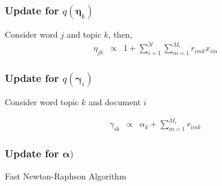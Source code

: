 \documentclass{beamer}
\numberwithin{equation}{section}
\begin{document}
\begin{frame}
\frametitle{Update for $q(\boldsymbol{\eta}_{k})$}

Consider word $j$ and topic $k$, then, 
\begin{eqnarray}
\eta_{jk} & \propto & 1 + \sum_{i=1}^{N} \sum_{m=1}^{M_{i}} r_{imk} x_{im} \nonumber 
\end{eqnarray}


\end{frame}


\begin{frame}
\frametitle{Update for $q(\boldsymbol{\gamma}_{i})$}

Consider word topic $k$ and document $i$ 

\begin{eqnarray}
\gamma_{ik} & \propto & \alpha_{k} +  \sum_{m=1}^{M_{i}} r_{imk} \nonumber 
\end{eqnarray}


\end{frame}

\begin{frame}
\frametitle{Update for $\boldsymbol{\alpha})$}

Fast Newton-Raphson Algorithm
\end{frame}
\end{document}
